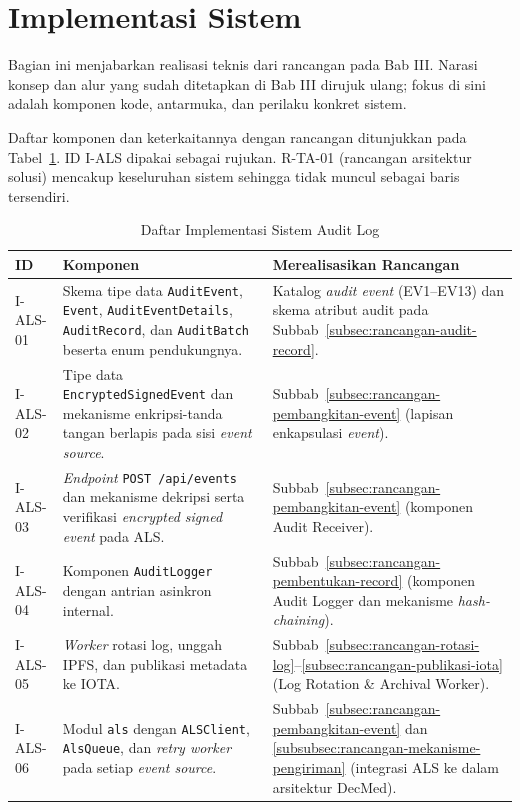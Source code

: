 \section{Implementasi Sistem}

Bagian ini menjabarkan realisasi teknis dari rancangan pada Bab III. Narasi
konsep dan alur yang sudah ditetapkan di Bab III dirujuk ulang; fokus di sini
adalah komponen kode, antarmuka, dan perilaku konkret sistem.

Daftar komponen dan keterkaitannya dengan rancangan ditunjukkan pada
Tabel~\ref{tab:daftar-implementasi-als}. ID I-ALS dipakai sebagai rujukan.
R-TA-01 (rancangan arsitektur solusi) mencakup keseluruhan sistem sehingga
tidak muncul sebagai baris tersendiri.

\begin{table}[htbp]
\centering
\caption{Daftar Implementasi Sistem Audit Log}
\label{tab:daftar-implementasi-als}
\renewcommand{\arraystretch}{1.3}
\begin{tabular}{|p{1.8cm}|p{5cm}|p{5.5cm}|}
\hline
\textbf{ID} & \textbf{Komponen} & \textbf{Merealisasikan Rancangan} \\
\hline
I-ALS-01 & Skema tipe data \texttt{AuditEvent}, \texttt{Event}, \texttt{AuditEventDetails}, \texttt{AuditRecord}, dan \texttt{AuditBatch} beserta enum pendukungnya. & Katalog \textit{audit event} (EV1--EV13) dan skema atribut audit pada Subbab~\ref{subsec:rancangan-audit-record}. \\
\hline
I-ALS-02 & Tipe data \texttt{EncryptedSignedEvent} dan mekanisme enkripsi-tanda tangan berlapis pada sisi \textit{event source}. & Subbab~\ref{subsec:rancangan-pembangkitan-event} (lapisan enkapsulasi \textit{event}). \\
\hline
I-ALS-03 & \textit{Endpoint} \texttt{POST /api/events} dan mekanisme dekripsi serta verifikasi \textit{encrypted signed event} pada ALS. & Subbab~\ref{subsec:rancangan-pembangkitan-event} (komponen Audit Receiver). \\
\hline
I-ALS-04 & Komponen \texttt{AuditLogger} dengan antrian asinkron internal. & Subbab~\ref{subsec:rancangan-pembentukan-record} (komponen Audit Logger dan mekanisme \textit{hash-chaining}). \\
\hline
I-ALS-05 & \textit{Worker} rotasi log, unggah IPFS, dan publikasi metadata ke IOTA. & Subbab~\ref{subsec:rancangan-rotasi-log}--\ref{subsec:rancangan-publikasi-iota} (Log Rotation \& Archival Worker). \\
\hline
I-ALS-06 & Modul \texttt{als} dengan \texttt{ALSClient}, \texttt{AlsQueue}, dan \textit{retry worker} pada setiap \textit{event source}. & Subbab~\ref{subsec:rancangan-pembangkitan-event} dan \ref{subsubsec:rancangan-mekanisme-pengiriman} (integrasi ALS ke dalam arsitektur DecMed). \\
\hline
\end{tabular}
\end{table}

